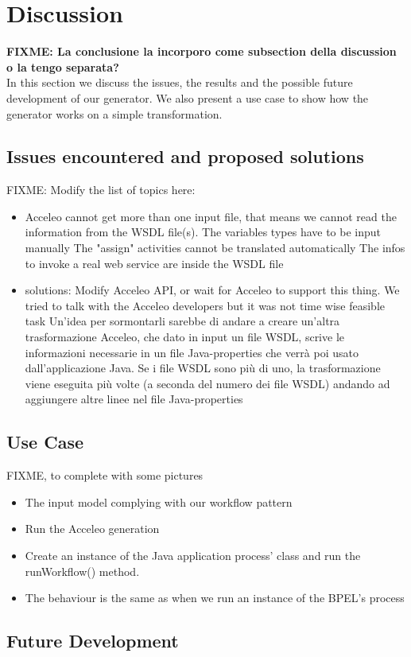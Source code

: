 \section{Discussion}
\label{Discussion}
\textbf{FIXME: La conclusione la incorporo come subsection della discussion o la tengo separata? }\\
In this section we discuss the issues, the results and the possible future development of our generator. We also present a use case to show how the generator works on a simple transformation.

\subsection{Issues encountered and proposed solutions}
\label{sec:issues}
FIXME: Modify the list of topics here:
\begin{itemize}
 \item Acceleo cannot get more than one input file, that means we cannot read the information from the WSDL file(s).
  \subitem The variables types have to be input manually
  \subitem The "assign" activities cannot be translated automatically
  \subitem The infos to invoke a real web service are inside the WSDL file
 \item solutions:
  \subitem Modify Acceleo API, or wait for Acceleo to support this thing.
  \subsubitem We tried to talk with the Acceleo developers but it was not time wise feasible task
  \subitem Un'idea per sormontarli sarebbe di andare a creare un'altra trasformazione Acceleo, che dato in input un file WSDL, scrive le informazioni necessarie in un file Java-properties che verrà poi usato dall'applicazione Java. Se i file WSDL sono più di uno, la trasformazione viene eseguita più volte (a seconda del numero dei file WSDL) andando ad aggiungere altre linee nel file Java-properties
\end{itemize}

\subsection{Use Case}
\label{sec:UseCase}
FIXME, to complete with some pictures
\begin{itemize}
 \item The input model complying with our workflow pattern
 \item Run the Acceleo generation
 \item Create an instance of the Java application process' class and run the runWorkflow() method.
 \item The behaviour is the same as when we run an instance of the BPEL's process 
\end{itemize}

\subsection{Future Development}
\label{sec:FutureDevelopment}

